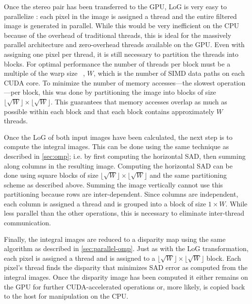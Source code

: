 \documentclass{article}
\let\orgautoref\autoref
\providecommand{\Cref}
        {\def\equationautorefname{Equation}%
         \def\figureautorefname{Figure}%
         \def\subfigureautorefname{Figure}%
         \def\Itemautorefname{Item}%
         \def\tableautorefname{Table}%
         \def\sectionautorefname{Section}%
         \def\subsectionautorefname{Section}%
         \def\subsubsectionautorefname{Section}%
         \def\chapterautorefname{Section}%
         \def\partautorefname{Part}%
         \orgautoref}
\newcommand{\floor}[1]{\lfloor#1\rfloor}
\begin{document}
Once the stereo pair has been transferred to the GPU, LoG is very easy to
parallelize : each pixel in the image is assigned a thread and the entire
filtered image is generated in parallel. While this would be very inefficient
on the CPU because of the overhead of traditional threads, this is ideal for
the massively parallel architecture and zero-overhead threads available on the
GPU. Even with assigning one pixel per thread, it is still necessary to
partition the threads into blocks. For optimal performance the number of
threads per block must be a multiple of the warp size ~\cite{cuda}, $W$, which
is the number of SIMD data paths on each CUDA core. To minimize the number of
memory accesses---the slowest operation---per block, this was done by
partitioning the image into blocks of size $\floor{\sqrt{W}} \times
\floor{\sqrt{W}}$. This guarantees that memory accesses overlap as much as possible within each block and that each block contains approximately $W$ threads.

Once the LoG of both input images have been calculated, the next step is to
compute the integral images. This can be done using the same technique as
described in \Cref{sec:omp}; i.e. by first computing the horizontal SAD, then
summing along columns in the resulting image. Computing the horizontal SAD can
be done using square blocks of size $\floor{\sqrt{W}} \times \floor{\sqrt{W}}$
and the same partitioning scheme as described above. Summing the image
vertically cannot use this partitioning because rows are inter-dependent. Since
columns are independent, each column is assigned a thread and is grouped into a
block of size $1 \times W$. While less parallel than the other operations, this
is necessary to eliminate inter-thread communication.

Finally, the integral images are reduced to a disparity map using the same
algorithm as described in \Cref{sec:parallel-omp}. Just as with the LoG transformation,
each pixel is assigned a thread and is assigned to a $\floor{\sqrt{W}} \times
\floor{\sqrt{W}}$ block. Each pixel's thread finds the disparity that minimizes
SAD error as computed from the integral images. Once the disparity image has
been computed it either remains on the GPU for further CUDA-accelerated
operations or, more likely, is copied back to the host for manipulation on the
CPU.
\end{document}
